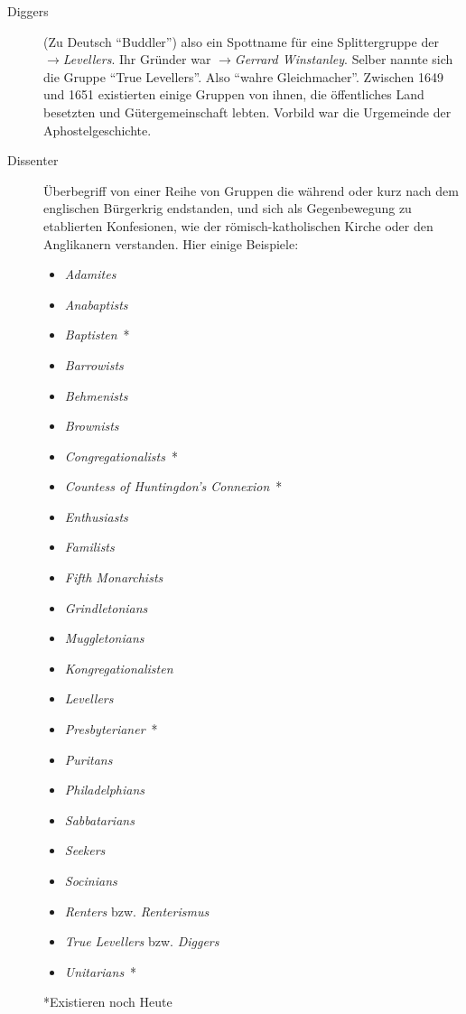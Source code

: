 \begin{description}
\item[Diggers] (Zu Deutsch "`Buddler"') also ein Spottname für eine Splittergruppe der
$\to$\textit{Levellers}. Ihr Gründer war $\to$\textit{Gerrard Winstanley}. Selber
nannte sich die Gruppe "`True Levellers"'. Also "`wahre Gleichmacher"'. Zwischen 1649
und 1651 existierten  einige Gruppen von ihnen, die öffentliches Land besetzten und Gütergemeinschaft lebten. Vorbild war die Urgemeinde der Aphostelgeschichte.

\item[Dissenter] Überbegriff von einer Reihe von Gruppen die während oder kurz
nach dem englischen Bürgerkrig endstanden, und sich als Gegenbewegung zu
etablierten Konfesionen, wie der römisch-katholischen Kirche oder den Anglikanern
verstanden. Hier einige Beispiele:

\begin{itemize}
 \item \textit{Adamites}
 \item \textit{Anabaptists}
 \item \textit{Baptisten}~*
 \item \textit{Barrowists}
 \item \textit{Behmenists}
 \item \textit{Brownists}
 \item \textit{Congregationalists}~*
 \item \textit{Countess of Huntingdon's Connexion}~*
 \item \textit{Enthusiasts}
 \item \textit{Familists}
 \item \textit{Fifth Monarchists}
 \item \textit{Grindletonians}
 \item \textit{Muggletonians}
 \item \textit{Kongregationalisten}
 \item \textit{Levellers}
 \item \textit{Presbyterianer}~*
 \item \textit{Puritans}
 \item \textit{Philadelphians}
 \item \textit{Sabbatarians}
 \item \textit{Seekers}
 \item \textit{Socinians}
 \item \textit{Renters} bzw. \textit{Renterismus}
 \item \textit{True Levellers} bzw. \textit{Diggers}
 \item \textit{Unitarians}~*
\end{itemize}
*Existieren noch Heute


\end{description}
